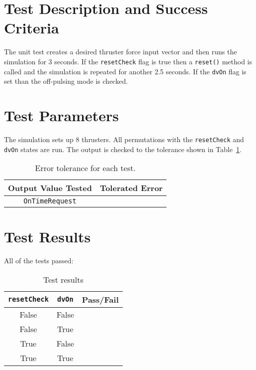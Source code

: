 

\section{Test Description and Success Criteria}
The unit test creates a desired thruster force input vector and then runs the simulation for 3 seconds.  If the {\tt resetCheck} flag is true then a {\tt reset()} method is called and the simulation is repeated for another 2.5 seconds.  If the {\tt dvOn} flag is set than the off-pulsing mode is checked.  




\section{Test Parameters}

The simulation sets up 8 thrusters.  All permutations with the {\tt resetCheck} and {\tt dvOn} states are run.  The output is checked to the tolerance shown in Table~\ref{tab:errortol}.

\begin{table}[htbp]
	\caption{Error tolerance for each test.}
	\label{tab:errortol}
	\centering \fontsize{10}{10}\selectfont
	\begin{tabular}{ c | c } %
		\hline\hline
		\textbf{Output Value Tested}  & \textbf{Tolerated Error}  \\ 
		\hline
		{\tt OnTimeRequest}        & 	   \\ 
		\hline\hline
	\end{tabular}
\end{table}




\section{Test Results}
All of the tests passed:
\begin{table}[H]
	\caption{Test results}
	\label{tab:results}
	\centering \fontsize{10}{10}\selectfont
	\begin{tabular}{c | c  | c } %
		\hline\hline
		{\tt resetCheck} & {\tt dvOn} &\textbf{Pass/Fail} \\ 
		\hline
	   False & False	   		&  \\ 
	   False & True	   			&  \\ 
	   True & False	   			&  \\ 
	   True & True	   			&  \\ 
	   \hline\hline
	\end{tabular}
\end{table}


